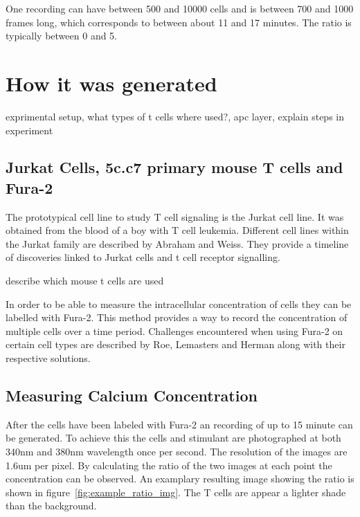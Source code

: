 One recording can have between 500 and 10000 cells and is between 700 and 1000 frames long, which corresponds to between about 11 and 17 minutes. The ratio is typically between 0 and 5.


\section{How it was generated}

exprimental setup, what types of t cells where used?, apc layer, explain steps in experiment

\subsection{Jurkat Cells, 5c.c7 primary mouse T cells and Fura-2}

The prototypical cell line to study T cell signaling is the Jurkat cell line.\cite{morgan2023} It was obtained from the blood of a boy with T cell leukemia.\cite{schneider1977} Different cell lines within the Jurkat family are described by Abraham and Weiss.\cite{abraham2004} They provide a timeline of discoveries linked to Jurkat cells and t cell receptor signalling.

describe which mouse t cells are used

In order to be able to measure the intracellular \Calcium concentration of cells they can be labelled with Fura-2. This method provides a way to record the \Calcium concentration of multiple cells over a time period.\cite{martinez2017} Challenges encountered when using Fura-2 on certain cell types are described by Roe, Lemasters and Herman along with their respective solutions.\cite{roe1990}

\subsection{Measuring Calcium Concentration}

After the cells have been labeled with Fura-2 an recording of up to 15 minute can be generated. To achieve this the cells and stimulant are photographed at both 340nm and 380nm wavelength once per second. The resolution of the images are 1.6um per pixel. By calculating the ratio of the two images at each point the \Calcium concentration can be observed. An examplary resulting image showing the ratio is shown in figure~\ref{fig:example_ratio_img}. The T cells are appear a lighter shade than the background.

